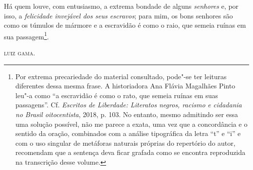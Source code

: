 Há quem louve, com entusiasmo, a extrema bondade de alguns
\emph{senhores} e, por isso, a \emph{felicidade invejável dos seus
escravos}; para mim, os bons senhores são como os túmulos de mármore e a
escravidão é como o raio, que semeia ruínas em sua passagem\footnote{
  Por extrema precariedade do material consultado, pode"-se ter leituras
  diferentes dessa mesma frase. A historiadora Ana Flávia Magalhães
  Pinto leu"-a como ``a escravidão é como o rato, que semeia ruínas em
  suas passagens''. Cf. \emph{Escritos de Liberdade: Literatos negros,
  racismo e cidadania no Brasil oitocentista}, 2018, p. 103. No entanto,
mesmo admitindo ser essa uma solução possível, não me parece a exata,
uma vez que a concordância e o sentido da oração, combinados com a análise tipográfica da letra ``t'' e
  ``i'' e com o uso singular de metáforas naturais
  próprias do repertório do autor, recomendam que a sentença deva ficar
  grafada como se encontra reproduzida na transcrição desse volume.}.

\bigskip

\hfill\textsc{luiz gama.}

\paginabranca
\mbox{}\vfill
\thispagestyle{empty}


